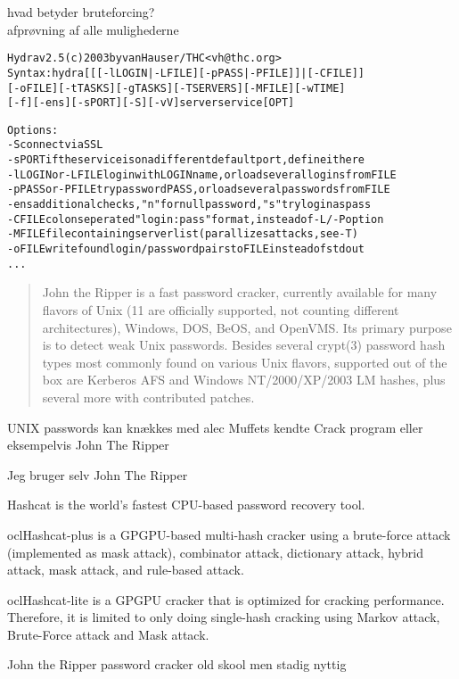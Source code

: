 \documentclass[20pt,landscape,a4paper,footrule]{foils}
\begin{document}

\begin{list1}
\item hvad betyder bruteforcing?\\
afprøvning af alle mulighederne
\end{list1}

\begin{alltt}
\small
Hydra v2.5 (c) 2003 by van Hauser / THC <vh@thc.org>
Syntax: hydra [[[-l LOGIN|-L FILE] [-p PASS|-P FILE]] | [-C FILE]] 
[-o FILE] [-t TASKS] [-g TASKS] [-T SERVERS] [-M FILE] [-w TIME] 
[-f] [-e ns] [-s PORT] [-S] [-vV] server service [OPT]

Options:
  -S        connect via SSL
  -s PORT   if the service is on a different default port, define it here
  -l LOGIN  or -L FILE login with LOGIN name, or load several logins from FILE
  -p PASS   or -P FILE try password PASS, or load several passwords from FILE
  -e ns     additional checks, "n" for null password, "s" try login as pass
  -C FILE   colon seperated "login:pass" format, instead of -L/-P option
  -M FILE   file containing server list (parallizes attacks, see -T)
  -o FILE   write found login/password pairs to FILE instead of stdout
...  
\end{alltt}


\begin{quote}
John the Ripper is a fast password cracker, currently available for
many flavors of Unix (11 are officially supported, not counting
different architectures), Windows, DOS, BeOS, and OpenVMS. Its primary
purpose is to detect weak Unix passwords. Besides several crypt(3)
password hash types most commonly found on various Unix flavors,
supported out of the box are Kerberos AFS and Windows NT/2000/XP/2003
LM hashes, plus several more with contributed patches.   
\end{quote}

\begin{list1}
\item UNIX passwords kan knækkes med alec Muffets kendte Crack program
  eller eksempelvis John The Ripper   
\item Jeg bruger selv John The Ripper
\end{list1}


\begin{list2}
\item Hashcat is the world's fastest CPU-based password recovery tool.
\item oclHashcat-plus is a GPGPU-based multi-hash cracker using a brute-force attack (implemented as mask attack), combinator attack, dictionary attack, hybrid attack, mask attack, and rule-based attack.
\item oclHashcat-lite is a GPGPU cracker that is optimized for cracking performance. Therefore, it is limited to only doing single-hash cracking using Markov attack, Brute-Force attack and Mask attack.
\item John the Ripper password cracker old skool men stadig nyttig
\end{list2}
\end{document}
